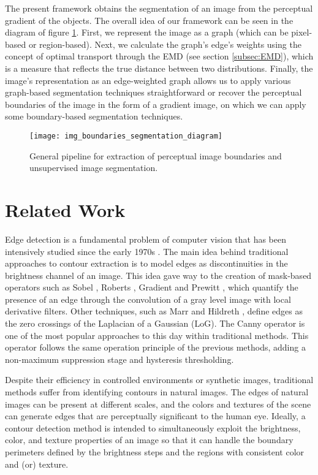 The present framework obtains the segmentation of an image from the perceptual gradient of the objects. The overall idea of our framework can be seen in the diagram of figure \ref{fig:pipeline_gabor_image_segmentation}. First, we represent the image as a graph (which can be pixel-based or region-based). Next, we calculate the graph's edge's weights using the concept of optimal transport through the EMD (see section \ref{subsec:EMD}), which is a measure that reflects the true distance between two distributions. Finally, the image's representation as an edge-weighted graph allows us to apply various graph-based segmentation techniques straightforward or recover the perceptual boundaries of the image in the form of a gradient image, on which we can apply some boundary-based segmentation techniques. 

\begin{figure}[!ht]
	\centering
	\texttt{[image: img\_boundaries\_segmentation\_diagram]}
	\caption{General pipeline for extraction of perceptual image boundaries and unsupervised image segmentation.}\label{fig:pipeline_gabor_image_segmentation}
\end{figure}

\section{Related Work}\label{sec:soa_boundaries_segmentation}
Edge detection is a fundamental problem of computer vision that has been intensively studied since the early 1970s \citep{Hueckel:JACM:1971, Fram.Deutsch:TC:1975}. The main idea behind traditional approaches to contour extraction is to model edges as discontinuities in the brightness channel of an image. This idea gave way to the creation of mask-based operators such as Sobel \citep{Sobel.Feldman:SAIL:1990}, Roberts \citep{Roberts:Thesis:1963}, Gradient \citep{Maitre:Book:2003} and Prewitt \citep{Prewitt:PPP:1970}, which quantify the presence of an edge through the convolution of a gray level image with local derivative filters. Other techniques, such as Marr and Hildreth \citep{Marr.Hildreth:PRS:1980}, define edges as the zero crossings of the Laplacian of a Gaussian (LoG). The Canny operator \citep{Canny:PAMI:1986} is one of the most popular approaches to this day within traditional methods. This operator follows the same operation principle of the previous methods, adding a non-maximum suppression stage and hysteresis thresholding. 

Despite their efficiency in controlled environments or synthetic images, traditional methods suffer from identifying contours in natural images. The edges of natural images can be present at different scales, and the colors and textures of the scene can generate edges that are perceptually significant to the human eye. Ideally, a contour detection method is intended to simultaneously exploit the brightness, color, and texture properties of an image so that it can handle the boundary perimeters defined by the brightness steps and the regions with consistent color and (or) texture.

